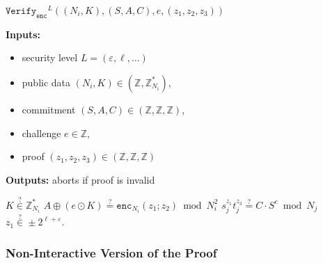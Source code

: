 \documentclass[11pt]{article}
\newenvironment{inlineAlgorithm}{}{}
\newcommand{\algoName}[1]{#1 \par}
\newcommand{\algoInputsList}[1]{
    {\small \bf Inputs:} 
        \begin{itemize}[noitemsep,topsep=0pt]
            #1
        \end{itemize}
}
\newcommand{\algoOutputs}[1]{
    {\small \bf Outputs:} #1 \par
}
\newcommand{\enc}{\ensuremath{\mathtt{enc}}}
\newcommand{\verify}[1]{\ensuremath{\mathtt{Verify}_{\mathtt{#1}}}}
\newcommand{\Z}{\mathbb{Z}}
\newcommand{\?}[1]{\stackrel{?}{#1}}
\begin{document}
\begin{description}
\item
\begin{inlineAlgorithm}
\algoName{$\verify{enc}^L((N_i, K), (S, A, C), e, (z_1, z_2, z_3))$}
\algoInputsList{
    \item security level $L = (\varepsilon, \ell, \dots)$
    \item public data $(N_i, K) \in (\Z, \Z^*_{N_i})$,
    \item commitment $(S, A, C) \in (\Z, \Z, \Z)$,
    \item challenge $e \in \Z$,
    \item proof $(z_1, z_2, z_3) \in (\Z, \Z, \Z)$
}
\algoOutputs{aborts if proof is invalid}
\begin{algorithmic}[1]
\State $K \? \in \Z^*_{N_i}$
\State $A \oplus (e \odot K) \? = \enc_{N_i}(z_1; z_2) \bmod N_i^2$
\State $s_j^{z_1} t_j^{z_3} \? = C \cdot S^e \bmod N_j$ 
\State $z_1 \? \in \pm 2^{\ell + \varepsilon}$.
\end{algorithmic}
\end{inlineAlgorithm}

\end{description}

\subsubsection{Non-Interactive Version of the Proof}
\end{document}
